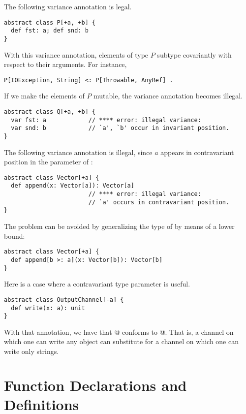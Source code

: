 \example The following variance annotation is legal. 
\begin{lstlisting}
abstract class P[+a, +b] {
  def fst: a; def snd: b
}
\end{lstlisting}
With this variance annotation, elements
of type $P$ subtype covariantly with respect to their arguments. 
For instance, 
\begin{lstlisting}
P[IOException, String] <: P[Throwable, AnyRef] .
\end{lstlisting}

If we make the elements of $P$ mutable, 
the variance annotation becomes illegal. 
\begin{lstlisting}
abstract class Q[+a, +b] { 
  var fst: a            // **** error: illegal variance:
  var snd: b            // `a', `b' occur in invariant position.
}
\end{lstlisting}

\example The following variance annotation is illegal, since $a$ appears
in contravariant position in the parameter of :

\begin{lstlisting}
abstract class Vector[+a] {
  def append(x: Vector[a]): Vector[a]  
                        // **** error: illegal variance: 
                        // `a' occurs in contravariant position.
}
\end{lstlisting} 
The problem can be avoided by generalizing the type of 
by means of a lower bound:

\begin{lstlisting}
abstract class Vector[+a] {
  def append[b >: a](x: Vector[b]): Vector[b] 
}
\end{lstlisting}

\example Here is a case where a contravariant type parameter is useful.

\begin{lstlisting}
abstract class OutputChannel[-a] {
  def write(x: a): unit
}
\end{lstlisting}
With that annotation, we have that
\lstinline@OutputChannel[AnyRef]@ conforms to \lstinline@OutputChannel[String]@.  
That is, a
channel on which one can write any object can substitute for a channel
on which one can write only strings.

\section{Function Declarations and Definitions}
\label{sec:defdef}
\label{sec:funsigs}
\label{sec:parameters}

